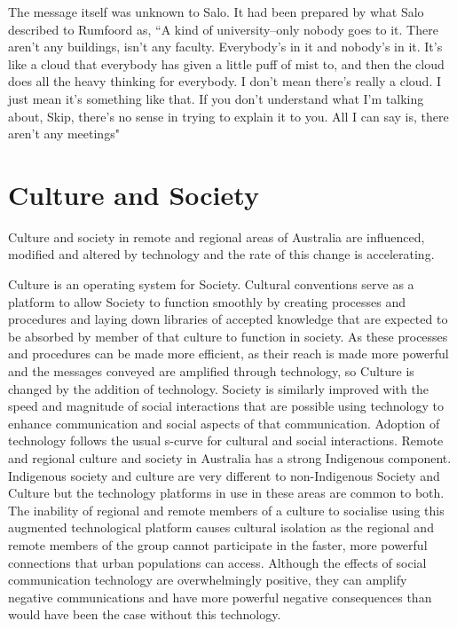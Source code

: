 \begin{savequote}[10cm] %
\sffamily
The message itself was unknown to Salo. It had been prepared by what Salo described to Rumfoord as, ``A kind of university--only nobody goes to it. There aren't any buildings, isn't any faculty. Everybody's in it and nobody's in it. It's like a cloud that everybody has given a little puff of mist to, and then the cloud does all the heavy thinking for everybody. I don't mean there's really a cloud. I just mean it's something like that. If you don't understand what I'm talking about, Skip, there's no sense in trying to explain it to you. All I can say is, there aren't any meetings"

\end{savequote}

\chapter{Culture and Society}
Culture and society in remote and regional areas of Australia are influenced, modified and altered by technology and the rate of this change is accelerating.

Culture is an operating system for Society. Cultural conventions serve as a platform to allow Society to function smoothly by creating processes and procedures and laying down libraries of accepted knowledge that are expected to be absorbed by member of that culture to function in society. As these processes and procedures can be made more efficient, as their reach is made more powerful and the messages conveyed are amplified through technology, so Culture is changed by the addition of technology. Society is similarly improved with the speed and magnitude of social interactions that are possible using technology to enhance communication and social aspects of that communication. Adoption of technology follows the usual s-curve for cultural and social interactions. Remote and regional culture and society in Australia has a strong Indigenous component. Indigenous society and culture are very different to non-Indigenous Society and Culture but the technology platforms in use in these areas are common to both. The inability of regional and remote members of a culture to socialise using this augmented technological platform causes cultural isolation as the regional and remote members of the group cannot participate in the faster, more powerful connections that urban populations can access.  Although the effects of social communication technology are overwhelmingly positive, they can amplify negative communications and have more powerful negative consequences than would have been the case without this technology. 



